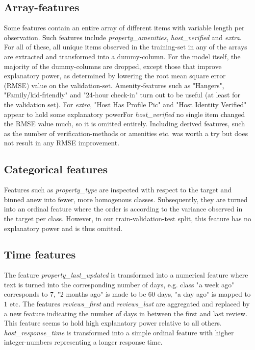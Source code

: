\documentclass[11pt, oneside]{article}   	%
\begin{document}
\subsection{Array-features}
\indent Some features contain an entire array of different items with variable length per observation. Such features include \textit{property\_amenities}, \textit{host\_verified} and \textit{extra}. For all of these, all unique items observed in the training-set in any of the arrays are extracted and transformed into a dummy-column. For the model itself, the majority of the dummy-columns are dropped, except those that improve explanatory power, as determined by lowering the root mean square error (RMSE) value on the validation-set. \newline
\indent Amenity-features such as "Hangers", "Family/kid-friendly" and "24-hour check-in" turn out to be useful (at least for the validation set). For \textit{extra}, "Host Has Profile Pic" and "Host Identity Verified" appear to hold some explanatory powerFor \textit{host\_verified} no single item changed the RMSE value much, so it is omitted entirely. Including derived features, such as the number of verification-methods or amenities etc. was worth a try but does not result in any RMSE improvement.

\subsection{Categorical features}
Features such as \textit{property\_type} are inspected with respect to the target and binned anew into fewer, more homogenous classes. Subsequently, they are turned into an ordinal feature where the order is according to the variance observed in the target per class. However, in our train-validation-test split, this feature has no explanatory power and is thus omitted.\newline

\subsection{Time features}
\indent The feature \textit{property\_last\_updated} is transformed into a numerical feature where text is turned into the corresponding number of days, e.g. class "a week ago" corresponds to $7$, "2 months ago" is made to be $60$ days, "a day ago" is mapped to $1$ etc.\newline
The features \textit{reviews\_first} and \textit{reviews\_last} are aggregated and replaced by a new feature indicating the number of days in between the first and last review. This feature seems to hold high explanatory power relative to all others.\newline
\textit{host\_response\_time} is transformed into a simple ordinal feature with higher integer-numbers representing a longer response time.
\end{document}
